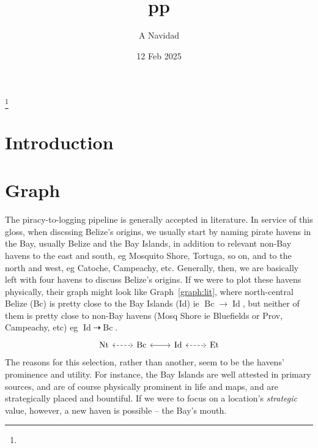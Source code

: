 \documentclass{amsart}
\DeclareMathOperator{\id}{Id}%
\DeclareMathOperator{\bc}{Bc}%
\DeclareMathOperator{\et}{Et}%
\DeclareMathOperator{\nt}{Nt}%
\theoremstyle{definition}%
\theoremstyle{definition}%
\theoremstyle{remark}%
\begin{document}
%
%
\title{pp}
\author{A Navidad}
\address{Harvard College, Cambridge MA}
\date{12 Feb 2025}
\thanks{\lipsum[1][1-3]}%
%
%
\begin{abstract}
\lipsum[1][1-6]
\end{abstract}
\keywords{\lipsum[1][1]}
%
%
\maketitle
%
%
%
%
\section{Introduction}
\label{s:intro}
\lipsum[1-2]
%
%
%
%
\section{Graph}
\label{s:graph}
The piracy-to-logging pipeline is generally accepted in literature. In service of this gloss, when discssing Belize's origins, we usually start by naming pirate havens in the Bay, usually Belize and the Bay Islands, in addition to relevant non-Bay havens to the east and south, eg Mosquito Shore, Tortuga, so on, and to the north and west, eg Catoche, Campeachy, etc. Generally, then, we are basically left with four havens to discuss Belize's origins. If we were to plot these havens physically, their graph might look like Graph~\ref{graph:lit}, where north-central Belize (Bc) is pretty close to the Bay Islands (Id) ie \(\bc\to\id\), but neither of them is pretty close to non-Bay havens (Mosq Shore ie Bluefields or Prov, Campeachy, etc) eg \(\id\dashrightarrow\bc\).
%
\begin{equation}
\label{graph:lit}%
\begin{tikzcd}[arrows=leftrightarrow]
\nt \rar[dashed] &\bc \rar &\id \rar[dashed] &\et
\end{tikzcd}
\end{equation}
%
The reasons for this selection, rather than another, seem to be the havens' prominence and utility. For instance, the Bay Islands are well attested in primary sources, and are of course physically prominent in life and maps, and are strategically placed and bountiful. If we were to focus on a location's \emph{strategic} value, however, a new haven is possible -- the Bay's mouth.
\end{document}
